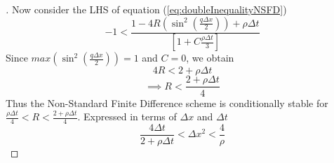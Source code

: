 \documentclass[a4paper]{article}
\begin{document}
\begin{proof}[]
	     Now consider the LHS of equation (\ref{eq:doubleInequalityNSFD})
	     \begin{equation*}
	        -1 <  \frac{ 1 - 4R(\sin^{2}(\frac{q\Delta x}{2}) ) + \rho \Delta t}{[1 + C\frac{\rho \Delta t}{3}]}
	     \end{equation*}
	     Since $max(\sin^{2}(\frac{q\Delta x}{2})) = 1$ and $C = 0$, we obtain
	     \begin{equation*}
	      4R < 2 + \rho\Delta t
	     \end{equation*}
	     \begin{equation*}
	         \implies R< \frac{2 + \rho\Delta t}{4}
	     \end{equation*}
	     Thus the Non-Standard Finite Difference scheme is conditionally stable for $\frac{\rho \Delta t}{4} < R < \frac{2 + \rho\Delta t}{4}$. Expressed in terms of $\Delta x$ and $\Delta t$
	     \begin{equation}\label{eq:finiteDifferenceStability}
	         \frac{4 \Delta t}{2+\rho \Delta t} < \Delta x^2 < \frac{4}{\rho}
	     \end{equation}
	     

\end{proof}
\end{document}
